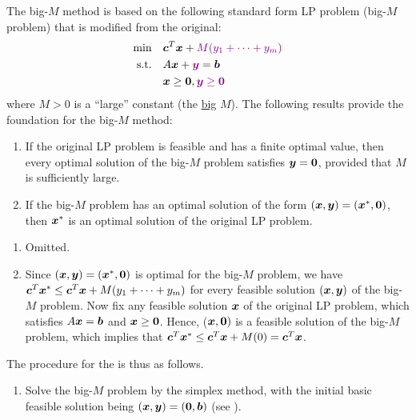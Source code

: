 \begin{enumerate}
The big-\(M\) method is based on the following standard form LP problem
(big-\(M\) problem) that is modified from the original:
\begin{align*}
\text{min}\quad&\bm{c}^{T}\bm{x}+{\color{violet}M(y_1+\dotsb+y_m)} \\
\text{s.t.}\quad&A\bm{x}+{\color{violet}\bm{y}}=\bm{b} \\
&\bm{x}\ge \bm{0},{\color{violet}\bm{y}\ge\bm{0}}
\end{align*}
where \(M>0\) is a ``large'' constant (the \underline{big} \(M\)). The
following results provide the foundation for the big-\(M\) method:
\begin{enumerate}
\item\label{it:big-m-y-zero} If the original LP problem is feasible and has a finite optimal value,
then every optimal solution of the big-\(M\) problem satisfies
\(\bm{y}=\bm{0}\), provided that \(M\) is sufficiently large.
\item\label{it:big-m-get-optim} If the big-\(M\) problem has an optimal solution of the form
\((\bm{x},\bm{y})=(\bm{x}^{*},\bm{0})\), then \(\bm{x}^*\) is an
optimal solution of the original LP problem.
\end{enumerate}
\begin{pf}
\begin{enumerate}
\item Omitted.
\item Since \((\bm{x},\bm{y})=(\bm{x}^{*},\bm{0})\) is optimal for the
big-\(M\) problem, we have \(\bm{c}^{T}\bm{x}^*\le
\bm{c}^{T}\bm{x}+M(y_1+\dotsb+y_m)\) for every feasible solution
\((\bm{x},\bm{y})\) of the big-\(M\) problem. Now fix any feasible solution
\(\bm{x}\) of the original LP problem, which satisfies \(A\bm{x}=\bm{b}\)
and \(\bm{x}\ge\bm{0}\). Hence, (\(\bm{x},\bm{0})\) is a feasible
solution of the big-\(M\) problem, which implies that
\(\bm{c}^{T}\bm{x}^{*}\le\bm{c}^{T}\bm{x}+M(0)=\bm{c}^{T}\bm{x}\).
\end{enumerate}
\end{pf}

The procedure for the  is thus as follows.
\begin{enumerate}[label={(\arabic*)}]
\item Solve the big-\(M\) problem by the simplex method, with the initial basic
feasible solution being \((\bm{x},\bm{y})=(\bm{0},\bm{b})\) (see
).


\end{enumerate}
\end{enumerate}
